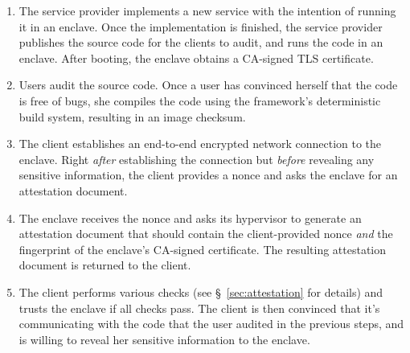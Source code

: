 \begin{enumerate}
    \item The service provider implements a new service with the intention of
      running it in an enclave.  Once the implementation is finished, the
      service provider publishes the source code for the clients to audit, and
      runs the code in an enclave.  After booting, the enclave obtains a
      CA-signed TLS certificate.

    \item Users audit the source code.  Once a user has convinced herself that
      the code is free of bugs, she compiles the code using the framework's
      deterministic build system, resulting in an image checksum.

    \item The client establishes an end-to-end encrypted network connection to
      the enclave.  Right \emph{after} establishing the connection but
      \emph{before} revealing any sensitive information, the client provides a
      nonce and asks the enclave for an attestation document.

    \item The enclave receives the nonce and asks its hypervisor to generate an
      attestation document that should contain the client-provided nonce
      \emph{and} the fingerprint of the enclave's CA-signed certificate.  The
      resulting attestation document is returned to the client.

    \item The client performs various checks (see \S~\ref{sec:attestation} for
      details) and trusts the enclave if all checks pass.  The client is then
      convinced that it's communicating with the code that the user audited in
      the previous steps, and is willing to reveal her sensitive information to
      the enclave.
\end{enumerate}


